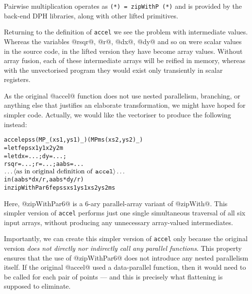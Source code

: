 Pairwise multiplication operates as \texttt{(*) = zipWithP (*)} and is provided by the back-end DPH libraries, along with other lifted primitives.

Returning to the definition of \texttt{accel} we see the problem with intermediate values. Whereas the variables @rsqr@, @r@, @dx@, @dy@ and so on were scalar values in the source code, in the lifted version they have become array values. Without array fusion, each of these intermediate arrays will be reified in memory, whereas with the unvectorised program they would exist only transiently in scalar registers. 

As the original @accel@ function does not use nested parallelism, branching, or anything else that justifies an elaborate transformation, we might have hoped for simpler code. Actually, we would like the vectoriser to produce the following instead:
%
\begin{small}
\begin{alltt}
  accel epss (MP _ (xs1,ys1) _) (MP ms (xs2,ys2) _)
   = let f eps x1 y1 x2 y2 m
           = let dx   = ...; dy = ...; 
                 rsqr = ...; r  = ...; aabs = ...
                 \(\ldots\langle\textrm{as in original definition of \texttt{accel}}\rangle\ldots\)
             in  (aabs * dx / r , aabs * dy / r)
     in  zipWithPar6 f epss xs1 ys1 xs2 ys2 ms
\end{alltt}
\end{small}
Here, @zipWithPar6@ is a 6-ary parallel-array variant of @zipWith@. This simpler version of \texttt{accel} performs just one single simultaneous traversal of all six input arrays, without producing any unnecessary array-valued intermediates. 

Importantly, we can create this simpler version of \texttt{accel} only because the original version \emph{does not directly nor indirectly call any parallel functions}. This property ensures that the use of @zipWithPar6@ does not introduce any nested parallelism itself. If the original @accel@ used a data-parallel function, then it would need to be called for each pair of points --- and this is precisely what flattening is supposed to eliminate.

